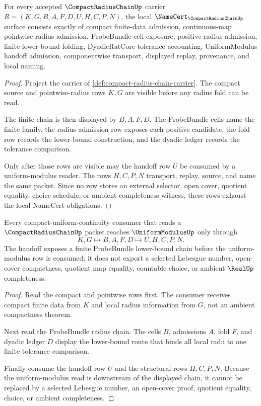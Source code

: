 \begin{theorem}
\label{thm:compact-radius-chain-namecert-obligations}
For every accepted $\CompactRadiusChainUp$ carrier $R=(K,G,B,A,F,D,U,H,C,P,N)$, the local $\NameCert_{\CompactRadiusChainUp}$ surface consists exactly of compact finite-data admission, continuous-map pointwise-radius admission, ProbeBundle cell exposure, positive-radius admission, finite lower-bound folding, DyadicRatCore tolerance accounting, UniformModulus handoff admission, componentwise transport, displayed replay, provenance, and local naming.
\end{theorem}
\begin{proof}
Project the carrier of \autoref{def:compact-radius-chain-carrier}. The compact source and pointwise-radius rows $K,G$ are visible before any radius fold can be read.

The finite chain is then displayed by $B,A,F,D$. The ProbeBundle cells name the finite family, the radius admission row exposes each positive candidate, the fold row records the lower-bound construction, and the dyadic ledger records the tolerance comparison.

Only after those rows are visible may the handoff row $U$ be consumed by a uniform-modulus reader. The rows $H,C,P,N$ transport, replay, source, and name the same packet. Since no row stores an external selector, open cover, quotient equality, choice schedule, or ambient completeness witness, these rows exhaust the local NameCert obligations.
\end{proof}

\begin{theorem}
\label{thm:compact-radius-chain-uniform-modulus-handoff}
Every compact-uniform-continuity consumer that reads a $\CompactRadiusChainUp$ packet reaches $\UniformModulusUp$ only through
$$
K,G \longmapsto B,A,F,D \longmapsto U,H,C,P,N .
$$
The handoff exposes a finite ProbeBundle lower-bound chain before the uniform-modulus row is consumed; it does not export a selected Lebesgue number, open-cover compactness, quotient map equality, countable choice, or ambient $\RealUp$ completeness.
\end{theorem}
\begin{proof}
Read the compact and pointwise rows first. The consumer receives compact finite data from $K$ and local radius information from $G$, not an ambient compactness theorem.

Next read the ProbeBundle radius chain. The cells $B$, admissions $A$, fold $F$, and dyadic ledger $D$ display the lower-bound route that binds all local radii to one finite tolerance comparison.

Finally consume the handoff row $U$ and the structural rows $H,C,P,N$. Because the uniform-modulus read is downstream of the displayed chain, it cannot be replaced by a selected Lebesgue number, an open-cover proof, quotient equality, choice, or ambient completeness.
\end{proof}

